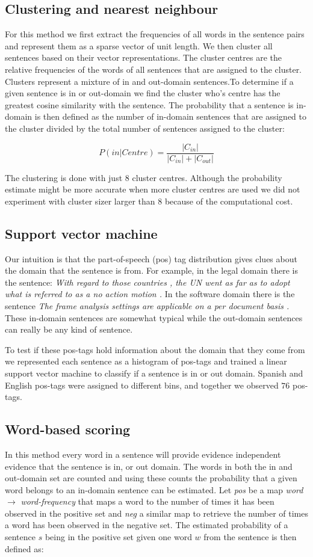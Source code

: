 \documentclass[11pt]{article}
\begin{document}
\subsection{Clustering and nearest neighbour}
For this method we first extract the frequencies of all words in the sentence pairs and represent them as a sparse vector of unit length. We then cluster all sentences based on their vector representations. The cluster centres are the relative frequencies of the words of all sentences that are assigned to the cluster. Clusters represent a mixture of in and out-domain sentences.To determine if a given sentence is in or out-domain we find the cluster who's centre has the greatest cosine similarity with the sentence. The probability that a sentence is in-domain is then defined as the number of in-domain sentences that are assigned to the cluster divided by the total number of sentences assigned to the cluster:

$$ P(in|C{entre}) = \frac{|C_{in}|}{|C_{in}| + |C_{out}|} $$

The clustering is done with just 8 cluster centres. Although the probability estimate might be more accurate when more cluster centres are used we did not experiment with cluster sizer larger than 8 because of the computational cost.

\subsection{Support vector machine}
Our intuition is that the part-of-speech (pos) tag distribution gives clues about the domain that the sentence is from. For example, in the legal domain there is the sentence:
\textit{With regard to those countries , the UN went as far as to adopt what is referred to as a no action motion .}
In the software domain there is the sentence \textit{The frame analysis settings are applicable on a per document basis .}
These in-domain sentences are somewhat typical while the out-domain sentences can really be any kind of sentence.

To test if these pos-tags hold information about the domain that they come from we represented each sentence as a histogram of pos-tags and trained a linear support vector machine to classify if a sentence is in or out domain. Spanish and English pos-tags were assigned to different bins, and together we observed $76$ pos-tags.

\subsection{Word-based scoring}
In this method every word in a sentence will provide evidence independent evidence that the sentence is in, or out domain. The words in both the in and out-domain set are counted and using these counts the probability that a given word belongs to an in-domain sentence can be estimated. Let \textit{pos} be a map \textit{word} $\rightarrow$ \textit{word-frequency} that maps a word to the number of times it has been observed in the positive set and \textit{neg} a similar map to retrieve the number of times a word has been observed in the negative set.
The estimated probability of a sentence $s$ being in the positive set given one word $w$ from the sentence is then defined as:
\end{document}
